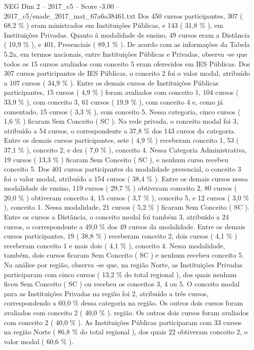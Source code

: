 \begin{textsample}{NEG Dim 2 – 2017\_c5 – Score -3.00 – 2017\_c5/enade\_2017\_mat\_67a6a38461.txt}
Dos 450 cursos participantes, 307 ( 68,2 \% ) eram ministrados em Instituições Públicas, e 143 ( 31,8 \% ), em Instituições Privadas.
Quanto à modalidade de ensino, 49 cursos eram a Distância ( 10,9 \% ), e 401, Presenciais ( 89,1 \% ).
De acordo com as informações da Tabela 5.2a, em termos nacionais, entre Instituições Públicas e Privadas, observa -se que todos os 15 cursos avaliados com conceito 5 eram oferecidos em IES Públicas.
Dos 307 cursos participantes de IES Públicas, o conceito 2 foi o valor modal, atribuído a 107 cursos ( 34,9 \% ).
Entre os demais cursos de Instituições Públicas participantes, 15 cursos ( 4,9 \% ) foram avaliados com conceito 1, 104 cursos ( 33,9 \% ), com conceito 3, 61 cursos ( 19,9 \% ), com conceito 4 e, como já comentado, 15 cursos ( 3,3 \% ), com conceito 5.
Nessa categoria, cinco cursos ( 1,6 \% ) ficaram Sem Conceito ( SC ).
Na rede privada, o conceito modal foi 3, atribuído a 54 cursos, o correspondente a 37,8 \% dos 143 cursos da categoria.
Entre os demais cursos participantes, sete ( 4,9 \% ) receberam conceito 1, 53 ( 37,1 \% ), conceito 2, e dez ( 7,0 \% ), conceito 4.
Nessa Categoria Administrativa, 19 cursos ( 13,3 \% ) ficaram Sem Conceito ( SC ), e nenhum curso recebeu conceito 5.
Dos 401 cursos participantes da modalidade presencial, o conceito 3 foi o valor modal, atribuído a 154 cursos ( 38,4 \% ).
Entre os demais cursos nessa modalidade de ensino, 119 cursos ( 29,7 \% ) obtiveram conceito 2, 80 cursos ( 20,0 \% ) obtiveram conceito 4, 15 cursos ( 3,7 \% ), conceito 5, e 12 cursos ( 3,0 \% ), conceito 1.
Nessa modalidade, 21 cursos ( 5,2 \% ) ficaram Sem Conceito ( SC ).
Entre os cursos a Distância, o conceito modal foi também 3, atribuído a 24 cursos, o correspondente a 49,0 \% dos 49 cursos da modalidade.
Entre os demais cursos participantes, 19 ( 38,8 \% ) receberam conceito 2, dois cursos ( 4,1 \% ) receberam conceito 1 e mais dois ( 4,1 \% ), conceito 4.
Nessa modalidade, também, dois cursos ficaram Sem Conceito ( SC ) e nenhum recebeu conceito 5.
Na análise por região, observa -se que, na região Norte, as Instituições Privadas participaram com cinco cursos ( 13,2 \% do total regional ), dos quais nenhum ficou Sem Conceito ( SC ) ou recebeu os conceitos 3, 4 ou 5.
O conceito modal para as Instituições Privadas na região foi 2, atribuído a três cursos, correspondendo a 60,0 \% dessa categoria na região.
Os outros dois cursos foram avaliados com conceito 2 ( 40,0 \% ). região.
Os outros dois cursos foram avaliados com conceito 2 ( 40,0 \% ).
As Instituições Públicas participaram com 33 cursos na região Norte ( 86,8 \% do total regional ), dos quais 22 obtiveram conceito 2, o valor modal ( 60,6 \% ).

\end{textsample}
